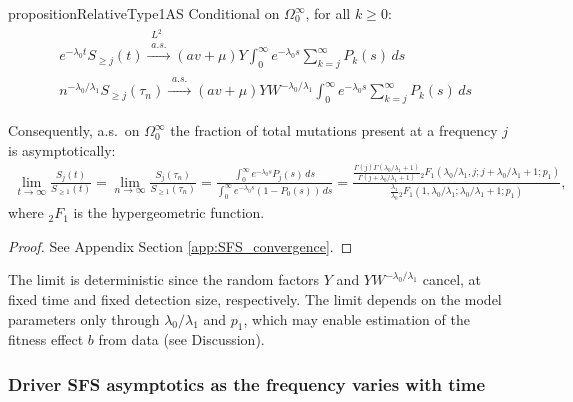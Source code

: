 \documentclass{article}
\numberwithin{equation}{section}
\begin{document}
\begin{restatable}{proposition}{RelativeType1AS}
  Conditional on $\Omega_0^\infty$, for all $k\geq 0$:
  \begin{align*}
    &e^{-\lambda_0 t}S_{\geq j}(t)\overset{\substack{L^2\\a.s.}}{\to}(av+\mu)Y\int_0^\infty e^{-\lambda_0 s}\sum_{k=j}^\infty P_k(s)\,ds\\
    &n^{-\lambda_0/\lambda_1}S_{\geq j}(\tau_n)\overset{\substack{a.s.}}{\to}(av+\mu)YW^{-\lambda_0/\lambda_1}\int_0^\infty e^{-\lambda_0 s}\sum_{k=j}^\infty P_k(s)\,ds
  \end{align*}

  Consequently, a.s.~on $\Omega_0^\infty$ the fraction of total mutations present at a frequency $j$ is asymptotically:
  \begin{align}
    \lim_{t\to\infty}\frac{S_j(t)}{S_{\geq 1}(t)}=\lim_{n\to\infty}\frac{S_j(\tau_n)}{S_{\geq 1}(\tau_n)}=\frac{\int_0^\infty e^{-\lambda_0 s}P_j(s)\,ds}{\int_0^\infty e^{-\lambda_0 s}\left(1-P_0(s)\right)\,ds}=\frac{\frac{\Gamma(j)\Gamma(\lambda_0/\lambda_1+1)}{\Gamma(j+\lambda_0/\lambda_1+1)}{}_2{F}_1(\lambda_0/\lambda_1,j;j+\lambda_0/\lambda_1+1;p_1)}{\frac{\lambda_1}{\lambda_0}{}_2F_1(1,\lambda_0/\lambda_1;\lambda_0/\lambda_1+1;p_1)},\label{eq:normalized_SFS_limit}
  \end{align}
where ${}_2F_1$ is the hypergeometric function.
\label{prop:fraction_as}
\end{restatable}
\begin{proof}
  See Appendix Section \ref{app:SFS_convergence}.
\end{proof}

The limit is deterministic since the random factors $Y$ and $Y W^{-\lambda_0/\lambda_1}$ cancel, at fixed time and fixed detection size, respectively. The limit depends on the model parameters only through $\lambda_0/\lambda_1$ and $p_1$, which may enable estimation of the fitness effect $b$ from data (see Discussion).  


\subsubsection{Driver SFS asymptotics as the frequency varies with time}\label{sec:SFSVary}
\end{document}
